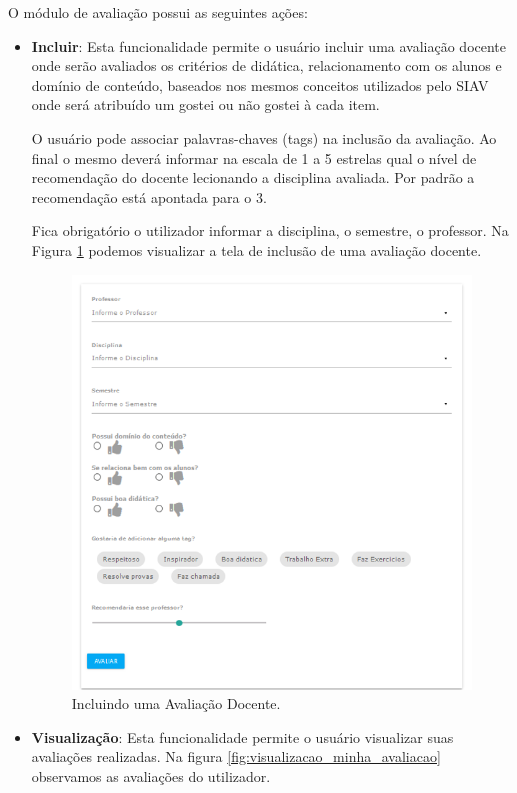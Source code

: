 \documentclass[12pt, a4paper]{report}
\begin{document}
O módulo de avaliação possui as seguintes ações:
\begin{itemize}
\item \textbf{Incluir}: Esta funcionalidade permite o usuário incluir uma avaliação docente onde serão avaliados os critérios de didática, relacionamento com os alunos e domínio de conteúdo, baseados nos mesmos conceitos utilizados pelo SIAV onde será atribuído um gostei ou não gostei à cada item.

O usuário pode associar palavras-chaves (tags) na inclusão da avaliação. Ao final o mesmo deverá informar na escala de 1 a 5 estrelas qual o nível de recomendação do docente lecionando a disciplina avaliada. Por padrão a recomendação está apontada para o 3. 

Fica obrigatório o utilizador informar a disciplina, o semestre, o professor. Na Figura \ref{fig:incluir_avaliacao}  podemos visualizar a tela de inclusão de uma avaliação docente.

\begin{figure}
\centering
\includegraphics[scale=0.47]{incluir_avaliacao.png}
\caption{Incluindo uma Avaliação Docente.}
\label{fig:incluir_avaliacao}
\end{figure}

\item \textbf{Visualização}: Esta funcionalidade permite o usuário visualizar suas avaliações realizadas. Na figura \ref{fig:visualizacao_minha_avaliacao} observamos as avaliações do utilizador.


\end{itemize}
\end{document}
